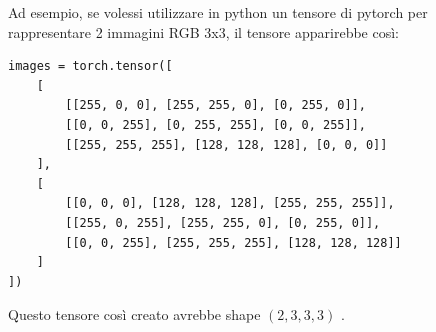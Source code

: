 Ad esempio, se volessi utilizzare in python un tensore di pytorch per rappresentare 2 immagini 
RGB 3x3, il tensore apparirebbe così:
\begin{lstlisting}
images = torch.tensor([
    [
        [[255, 0, 0], [255, 255, 0], [0, 255, 0]], 
        [[0, 0, 255], [0, 255, 255], [0, 0, 255]], 
        [[255, 255, 255], [128, 128, 128], [0, 0, 0]]
    ], 
    [
        [[0, 0, 0], [128, 128, 128], [255, 255, 255]], 
        [[255, 0, 255], [255, 255, 0], [0, 255, 0]], 
        [[0, 0, 255], [255, 255, 255], [128, 128, 128]]
    ] 
])
\end{lstlisting}
Questo tensore così creato avrebbe shape $(2, 3, 3, 3)$ .






